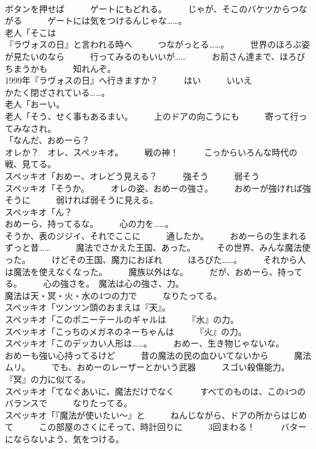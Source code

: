 \documentclass[8pt]{extreport}
\begin{document}
\begin{CJK}{UTF8}{min}
\\	ボタンを押せば　　　ゲートにもどれる。　　　じゃが、そこのバケツからつながる　　　ゲートには気をつけるんじゃな……。	
\\	老人「そこは
\\	『ラヴォスの日』と言われる時へ　　　つながっとる……。　　　世界のほろぶ姿が見たいのなら　　　行ってみるのもいいが……　　　お前さん達まで、ほろびちまうかも　　　知れんぞ。	
\\	1999年『ラヴォスの日』へ行きますか？　　　はい　　　いいえ	
\\	かたく閉ざされている……。	
\\	老人「おーい。	
\\	老人「そう、せく事もあるまい。　　　上のドアの向こうにも　　　寄って行ってみなされ。	
\\	「なんだ、おめーら？	
\\	オレか？　オレ、スペッキオ。　　　戦の神！　　　こっからいろんな時代の戦、見てる。	
\\	スペッキオ「おめー、オレどう見える？　　　強そう　　　弱そう	
\\	スペッキオ「そうか。　　　オレの姿、おめーの強さ。　　　おめーが強ければ強そうに　　　弱ければ弱そうに見える。	
\\	スペッキオ「ん？	
\\	おめーら、持ってるな。　　　心の力を……。	
\\	そうか、表のジジイ、それでここに　　　通したか。　　　おめーらの生まれるずっと昔……　　　魔法でさかえた王国、あった。　　　その世界、みんな魔法使った。　　　けどその王国、魔力におぼれ　　　ほろびた……。　　　それから人は魔法を使えなくなった。　　　魔族以外はな。　　　だが、おめーら、持ってる。　　　心の強さを。　魔法は心の強さ、力。	
\\	魔法は天・冥・火・水の4つの力で　　　なりたってる。	
\\	スペッキオ「ツンツン頭のおまえは『天』。	
\\	スペッキオ「このポニーテールのギャルは　　　『水』の力。	
\\	スペッキオ「こっちのメガネのネーちゃんは　　　『火』の力。	
\\	スペッキオ「このデッカい人形は……。　　　おめー、生き物じゃないな。　　　おめーも強い心持ってるけど　　　昔の魔法の民の血ひいてないから　　　魔法ムリ。　　　でも、おめーのレーザーとかいう武器　　　スゴい殺傷能力。　　　『冥』の力に似てる。	
\\	スペッキオ「てなぐあいに、魔法だけでなく　　　すべてのものは、この4つのバランスで　　　なりたってる。	
\\	スペッキオ「『魔法が使いたい～』と　　　ねんじながら、ドアの所からはじめて　　　この部屋のさくにそって、時計回りに　　　3回まわる！　　　バターにならないよう、気をつける。	

\end{CJK}
\end{document}
